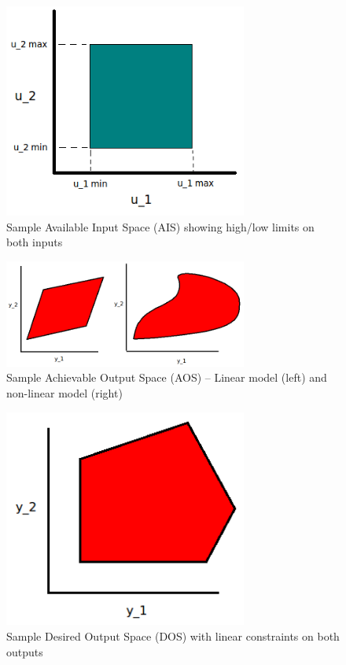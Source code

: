 \begin{figure}[htbp]
  \centering
  \includegraphics[width=8cm]{graph/sample_ais}
  \caption[Sample Available Input Space]{Sample Available Input Space (AIS) showing high/low limits on both inputs}
  \label{fig:sampleais}
\end{figure}

\begin{figure}[htbp]
  \centering
  \includegraphics[width=8cm]{graph/sample_aos}
  \caption[Sample Achievable Output Space]{Sample Achievable Output Space (AOS)
    -- Linear model (left) and non-linear model (right)}
  \label{fig:sampleaos}
\end{figure}

\begin{figure}[htbp]
  \centering
  \includegraphics[width=8cm]{graph/sample_dos}
  \caption[Sample Desired Output Space]{Sample Desired Output Space (DOS) with 
    linear constraints on both outputs}
  \label{fig:sampledos}
\end{figure}

